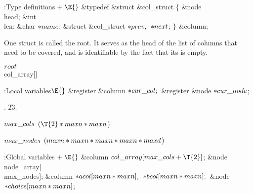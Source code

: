 \Y\B\4:Type definitions\X${}\mathrel+\E{}$\6
\&{typedef} \&{struct} \&{col\_struct} ${}\{{}$\1\6
\&{node} \\{head};\6
\&{int} \\{len};\6
\&{char} ${}{*}\\{name}{}$;\6
\&{struct} \&{col\_struct} ${}{*}\\{prev},{}$ ${}{*}\\{next}{}$;\2\6
${}\}{}$ \&{column};\par
\fi

One  struct is called the root. It serves as the head of
the
list of columns that need to be covered, and is identifiable by the fact
that its  is empty.

\Y\B\4\D$\\{root}$ \5
\\{col\_array}[]\par
\Y\B\4:Local variables\X${}\E{}$\6
\&{register} \&{column} ${}{*}\\{cur\_col};{}$\6
\&{register} \&{node} ${}{*}\\{cur\_node}{}$;\par
{}.
\U23.\fi

\B\D$\\{max\_cols}$ \5
$(\T{2}*\\{maxn}*\\{maxn}{}$)\par
\B\4\D$\\{max\_nodes}$ \5
$(\\{maxn}*\\{maxn}*\\{maxn}*\\{maxn}*\\{maxd}{}$)\par
\Y\B\4:Global variables\X${}\mathrel+\E{}$\6
\&{column} ${}\\{col\_array}[\\{max\_cols}+\T{2}]{}$;\6
\&{node} \\{node\_array}[\\{max\_nodes}];\6
\&{column} ${}{*}\\{acol}[\\{maxn}*\\{maxn}],{}$ ${}{*}\\{bcol}[\\{maxn}*%
\\{maxn}];{}$\6
\&{node} ${}{*}\\{choice}[\\{maxn}*\\{maxn}]{}$;\par
\fi

